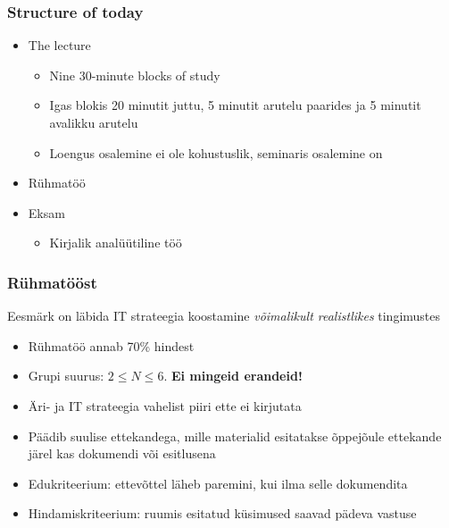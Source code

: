 \begin{frame}[fragile]
  \frametitle{Structure of today}
	\begin{itemize}
	\item The lecture
	\begin{itemize}
		\item Nine 30-minute blocks of study
		\item Igas blokis 20 minutit juttu, 5 minutit arutelu paarides ja 5 minutit avalikku arutelu
		\item Loengus osalemine ei ole kohustuslik, seminaris osalemine on
	\end{itemize}
	\item Rühmatöö
	\item Eksam
	\begin{itemize}
		\item Kirjalik analüütiline töö
	\end{itemize}

	\end{itemize}
\end{frame}

\begin{frame}[fragile]
  \frametitle{Rühmatööst}
Eesmärk on läbida IT strateegia koostamine \emph{võimalikult realistlikes} tingimustes 
  	\begin{itemize}
		\item Rühmatöö annab 70\% hindest
		\item Grupi suurus: $2\leq N\leq6$. \textbf{Ei mingeid erandeid!}
		\item Äri- ja IT strateegia vahelist piiri ette ei kirjutata
		\item Päädib suulise ettekandega, mille materialid esitatakse õppejõule ettekande järel kas dokumendi või esitlusena
		\item Edukriteerium: ettevõttel läheb paremini, kui ilma selle dokumendita
		\item Hindamiskriteerium: ruumis esitatud küsimused saavad pädeva vastuse
	\end{itemize}
\end{frame}


